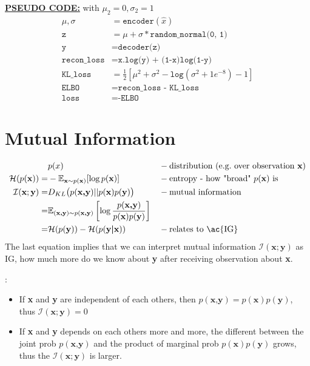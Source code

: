 \underline{\textbf{PSEUDO CODE:}} with $\mu_2=0, \sigma_2 = 1$
\begin{align}
	\mu, \sigma &= \texttt{encoder}(\hat{x})\\
	\texttt{z} &= \mu + \sigma * \texttt{random\_normal(0, 1)}\\
	\texttt{y} &= \texttt{decoder(z)}\\
	\texttt{recon\_loss} &= \texttt{x.log(y) + (1-x)log(1-y)}\\
	\texttt{KL\_loss} &= \frac{1}{2} [ \mu^2 + \sigma^2 - \texttt{log}(\sigma^2 + 1e^{-8}) -1 ]\\
	\texttt{ELBO} &= \texttt{recon\_loss - KL\_loss}\\
	\texttt{loss} &= \texttt{-ELBO}
\end{align}

\section{Mutual Information}
\begin{align}
	&p(x) &&-\text{distribution (\eg over observation $\textbf{x}$)}\\
	\mathcal{H}(p(\textbf{x})) =& -\mathbb{E}_{\textbf{x}\sim p(\textbf{x})} [\log p(\textbf{x})] &&-\text{entropy - how "broad" $p(\textbf{x})$ is}\\
	\mathcal{I}(\textbf{x};\textbf{y}) =& D_{KL} \big(p(\textbf{x,y}) || p(\textbf{x}) p(\textbf{y})\big) &&-\text{mutual information}\\
	=& \mathbb{E}_{(\textbf{x,y}) \sim p(\textbf{x,y})} \left[ \log \frac{p(\textbf{x,y})}{p(\textbf{x})p(\textbf{y})} \right]\\
	=& \mathcal{H}(p(\textbf{y})) - \mathcal{H}(p(\textbf{y|x})) &&-\text{relates to \ac{IG}}
\end{align}
The last equation implies that we can interpret mutual information $\mathcal{I}(\textbf{x};\textbf{y})$ as \ac{IG}, how much more do we know about \textbf{y} after receiving observation about \textbf{x}.

\Eg:
\begin{itemize}
	\item If \textbf{x} and \textbf{y} are independent of each others, then $p(\textbf{x,y}) = p(\textbf{x}) p(\textbf{y})$, thus $\mathcal{I}(\textbf{x};\textbf{y})=0$
	\item If \textbf{x} and \textbf{y} depends on each others more and more, the different between the joint \ac{prob} $p(\textbf{x,y})$ and the product of marginal \ac{prob} $p(\textbf{x}) p(\textbf{y})$ grows, thus the $\mathcal{I}(\textbf{x};\textbf{y})$ is larger.
\end{itemize}
